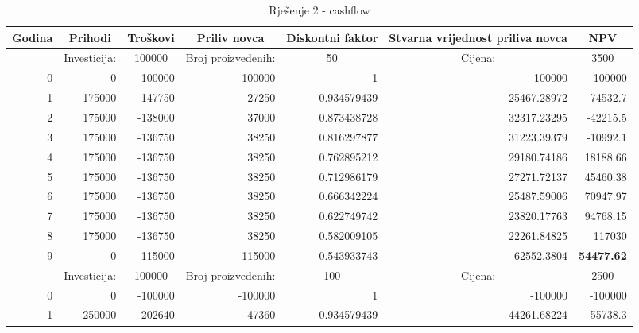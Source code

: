 \documentclass[12pt]{article}
\begin{document}
\begin{landscape}
\begin{table}[htbp]
  \centering
  \caption{Rješenje 2 - cashflow}
    \begin{tabular}{rrrrrrr}
    \toprule
    \multicolumn{1}{c}{Godina} & \multicolumn{1}{c}{Prihodi} & \multicolumn{1}{c}{Troškovi} & \multicolumn{1}{c}{Priliv novca} & \multicolumn{1}{c}{Diskontni faktor} & \multicolumn{1}{p{8.145em}}{Stvarna vrijednost \newline{}priliva novca} & \multicolumn{1}{c}{NPV} \\
    \midrule
          & \multicolumn{1}{c}{Investicija:} & \multicolumn{1}{c}{100000} & \multicolumn{1}{c}{Broj proizvedenih:} & \multicolumn{1}{c}{50} & \multicolumn{1}{c}{Cijena:} & \multicolumn{1}{c}{3500} \\
    \midrule
    0     & 0     & -100000 & -100000 & 1     & -100000 & -100000 \\
    1     & 175000 & -147750 & 27250 & 0.934579439 & 25467.28972 & -74532.7 \\
    2     & 175000 & -138000 & 37000 & 0.873438728 & 32317.23295 & -42215.5 \\
    3     & 175000 & -136750 & 38250 & 0.816297877 & 31223.39379 & -10992.1 \\
    4     & 175000 & -136750 & 38250 & 0.762895212 & 29180.74186 & 18188.66 \\
    5     & 175000 & -136750 & 38250 & 0.712986179 & 27271.72137 & 45460.38 \\
    6     & 175000 & -136750 & 38250 & 0.666342224 & 25487.59006 & 70947.97 \\
    7     & 175000 & -136750 & 38250 & 0.622749742 & 23820.17763 & 94768.15 \\
    8     & 175000 & -136750 & 38250 & 0.582009105 & 22261.84825 & 117030 \\
    9     & 0     & -115000 & -115000 & 0.543933743 & -62552.3804 & \textbf{54477.62} \\
    \midrule
          & \multicolumn{1}{c}{Investicija:} & \multicolumn{1}{c}{100000} & \multicolumn{1}{c}{Broj proizvedenih:} & \multicolumn{1}{c}{100} & \multicolumn{1}{c}{Cijena:} & \multicolumn{1}{c}{2500} \\
    \midrule
    0     & 0     & -100000 & -100000 & 1     & -100000 & -100000 \\
    1     & 250000 & -202640 & 47360 & 0.934579439 & 44261.68224 & -55738.3 \\

\end{tabular}
\end{table}
\end{landscape}
\end{document}
